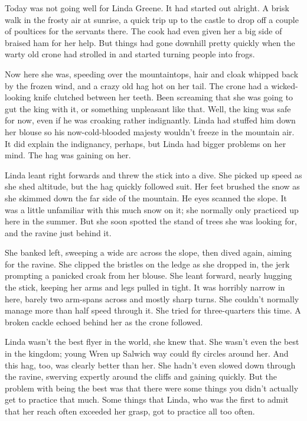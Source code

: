 
Today was not going well for Linda Greene.
It had started out alright.
A brisk walk in the frosty air at sunrise, a quick trip up to the castle to drop off a couple of poultices for the servants there.
The cook had even given her a big side of braised ham for her help.
But things had gone downhill pretty quickly when the warty old crone had strolled in and started turning people into frogs.

Now here she was, speeding over the mountaintops, hair and cloak whipped back by the frozen wind, and a crazy old hag hot on her tail.
The crone had a wicked-looking knife clutched between her teeth.
Been screaming that she was going to gut the king with it, or something unpleasant like that.
Well, the king was safe for now, even if he was croaking rather indignantly.
Linda had stuffed him down her blouse so his now-cold-blooded majesty wouldn't freeze in the mountain air.
It did explain the indignancy, perhaps, but Linda had bigger problems on her mind.
The hag was gaining on her.

Linda leant right forwards and threw the stick into a dive.
She picked up speed as she shed altitude, but the hag quickly followed suit.
Her feet brushed the snow as she skimmed down the far side of the mountain.
He eyes scanned the slope.
It was a little unfamiliar with this much snow on it; she normally only practiced up here in the summer.
But she soon spotted the stand of trees she was looking for, and the ravine just behind it.

She banked left, sweeping a wide arc across the slope, then dived again, aiming for the ravine.
She clipped the bristles on the ledge as she dropped in, the jerk prompting a panicked croak from her blouse.
She leant forward, nearly hugging the stick, keeping her arms and legs pulled in tight.
It was horribly narrow in here, barely two arm-spans across and mostly sharp turns.
She couldn't normally manage more than half speed through it.
She tried for three-quarters this time.
A broken cackle echoed behind her as the crone followed.

Linda wasn't the best flyer in the world, she knew that.
She wasn't even the best in the kingdom; young Wren up Salwich way could fly circles around her.
And this hag, too, was clearly better than her.
She hadn't even slowed down through the ravine, swerving expertly around the cliffs and gaining quickly.
But the problem with being the best was that there were some things you didn't actually get to practice that much.
Some things that Linda, who was the first to admit that her reach often exceeded her grasp, got to practice all too often.

